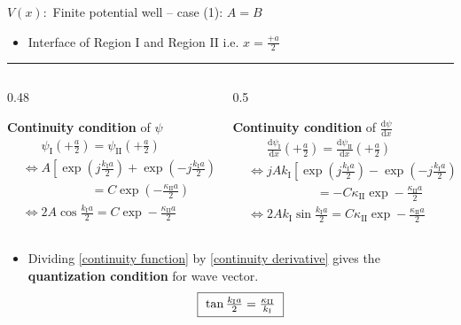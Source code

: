 %
\begin{frame}{\(V(x) :\) Finite potential well -- case (1):  \( A = B\)}
	\begin{itemize}
		\item Interface of Region I and Region II i.e. \(x = \tfrac{+a}{2}\)
	\end{itemize}
	\hrule
\begin{small}
		\begin{columns}
		\begin{column}[t]{0.48\textwidth}
			\begin{block}{\textbf{Continuity condition} of \(\psi\)}
				\begin{align*}
					&\phantom{\Leftrightarrow}\psi_\text{I}\left(+\frac{a}{2}\right) = \psi_\text{II}\left(+\frac{a}{2}\right)\nonumber\\
					&\Leftrightarrow A \left[ \exp \left(j \frac{k_\text{I}a}{2}\right) +  \exp \left(- j  \frac{k_\text{I} a}{2}\right)\right]\nonumber\\
					&\phantom{\Leftrightarrow}	\qquad \qquad = C \exp\left( -  \frac{\kappa_\text{II}a}{2}\right)\nonumber	\\
					&\Leftrightarrow 2A \cos \frac{k_\text{I}a}{2} = C \exp -  \frac{\kappa_\text{II}a}{2}\tag{1}\label{continuity function}
				\end{align*}
			\end{block}
		\end{column}
		\begin{column}[t]{0.5\textwidth}
			\begin{block}{\textbf{Continuity condition} of \(\tfrac{\mathrm{d}\psi}{\mathrm{d}x}\)}
				\begin{align}
					&\phantom{\Leftrightarrow}\frac{\mathrm{d}\psi_\text{I}}{\mathrm{d}x}\left(+\frac{a}{2}\right) = \frac{\mathrm{d}\psi_\text{II}}{\mathrm{d}x}\left(+\frac{a}{2}\right) \nonumber\\
					&\Leftrightarrow jAk_\text{I}\left[\exp \left(j \frac{k_\text{I}a}{2}\right) - \exp \left(- j  \frac{k_\text{I} a}{2}\right)\right]\nonumber\\
					&\phantom{\Leftrightarrow} \qquad\qquad  = -C\kappa_\text{II} \exp -  \frac{\kappa_\text{II}a}{2}\nonumber\\
					&\Leftrightarrow 2A k_\text{I}\sin \frac{k_\text{I}a}{2} = C \kappa_\text{II} \exp -\frac{\kappa_\text{II}a}{2} 	\tag{2}\label{continuity derivative}
				\end{align}
			\end{block}
		\end{column}
	\end{columns}
\end{small}
	\begin{itemize}
		\item Dividing \eqref{continuity function} by \eqref{continuity derivative} gives the \textbf{quantization condition} for wave vector.
			\[
			\fbox{
			$
			\tan \frac{k_\text{I}a}{2} = \frac{\kappa_\text{II}}{k_\text{I}}
			$
			}
			\]
	\end{itemize}
\end{frame}
